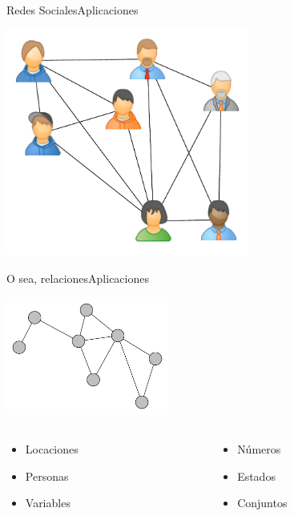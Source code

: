 \documentclass[spanish, c]{beamer}
\begin{document}
\begin{frame}{Redes Sociales}{Aplicaciones}
    \begin{center}
        \includegraphics[width=0.6\textwidth]{social.pdf}
    \end{center}
\end{frame}

\begin{frame}{O sea, relaciones}{Aplicaciones}
    \begin{center}
        \includegraphics[width=0.4\textwidth]{graph01.pdf}
    \end{center}

    \begin{columns}
        \begin{column}{0.5\textwidth}
            \begin{itemize}
                \item Locaciones
                \item Personas
                \item Variables
            \end{itemize}
        \end{column}
        \begin{column}{0.5\textwidth}
            \begin{itemize}
                \item Números
                \item Estados
                \item Conjuntos
            \end{itemize}
        \end{column}
    \end{columns}
\end{frame}
\end{document}
